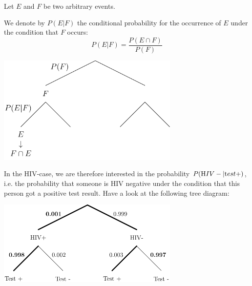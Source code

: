 \documentclass[twoside,11pt,a4paper]{article}
\newif\ifEN \ENtrue	                %
\def\tr|#1|#2|{\ifEN #2\else #1\fi}     %
\def\trr;#1;#2;{\ifEN #2\else #1\fi}     %
\newenvironment{ttile}[1]{\begin{tcolorbox}[colback=tile,sharp corners,title=#1]}{\end{tcolorbox}}
\def\vsp{\vspace{5mm}}
\theoremstyle{definition}
\begin{document}
\tr|Seinen $E$ und $F$ zwei beliebige Ereignisse.| Let $E$ and $F$ be two arbitrary events.|
\vsp

\begin{ttile}{\tr|Bedingte Wahrscheinlichkeit|Conditional Probability|}
  \trr;Wir bezeichnen mit $P(E|F)$ die bedingte Wahrscheinlichkeit für das Auftreten von $E$
  unter der Bedingung, dass $F$ auftritt:
  ;We denote by $P (E|F)$ the conditional probability for the occurrence of $E$
  under the condition that $F$ occurs:;
\[
P(E|F)=\frac{P(E\cap F)}{P(F)}
\]
\end{ttile}
\vsp


\begin{center}
  \includegraphics[width=9cm]{tree_Cond}
\end{center}


\trr;Im Falle von HIV sind wir deshalb an der Wahrscheinlichkkeit  $P(\text{HIV}- | \text{Test}+)$ interessiert, d.h. an der Wahrscheinlichkeit, dass eine Person HIV-negativ ist, wenn Sie einen
positiven Test erhalten hat. 
;In the HIV-case, we are therefore interested in the probability $P(\text{HIV}- | \text{test}+)$, 
i.e. the probability that someone is HIV negative under the condition that this person got a positive test result. Have a look at the following tree diagram:;

\begin{center}
  \includegraphics[width=9cm]{tree_HIV}
\end{center}
\end{document}
